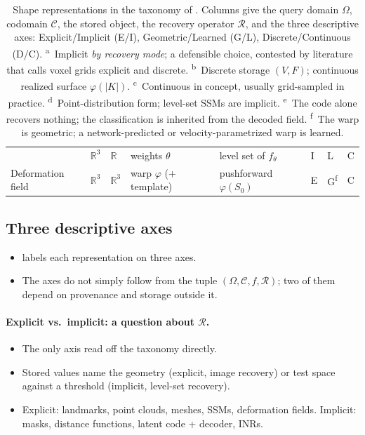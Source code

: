 \begin{table}[htbp]
\begin{tabularx}{\textwidth}{@{}l l l l X l l l@{}}
            & $\mathbb{R}^3$ & $\mathbb{R}$ & weights $\theta$
            & level set of $f_\theta$ & I & L & C \\
        Deformation field
            & $\mathbb{R}^3$ & $\mathbb{R}^3$ & warp $\varphi$ (+ template)
            & pushforward $\varphi(S_0)$ & E & G\textsuperscript{f} & C \\
        \bottomrule
    \end{tabularx}
    \caption[Taxonomy of shape representations]{Shape representations in the taxonomy of
    . Columns give the query domain $\Omega$, codomain $\mathcal{C}$, the
    stored object, the recovery operator $\mathcal{R}$, and the three descriptive axes:
    Explicit/Implicit (E/I), Geometric/Learned (G/L), Discrete/Continuous (D/C).
    \textsuperscript{a}~Implicit \emph{by recovery mode}; a defensible choice, contested by
    literature that calls voxel grids explicit and discrete.
    \textsuperscript{b}~Discrete storage $(V,F)$; continuous realized surface $\varphi(|K|)$.
    \textsuperscript{c}~Continuous in concept, usually grid-sampled in practice.
    \textsuperscript{d}~Point-distribution form; level-set SSMs are implicit.
    \textsuperscript{e}~The code alone recovers nothing; the classification is inherited from the
    decoded field. \textsuperscript{f}~The warp is geometric; a network-predicted or
    velocity-parametrized warp is learned.}
    \label{tab:shape-representations}
\end{table}

\subsection{Three descriptive axes}
\label{sec:shape-axes}

\begin{itemize}
    \item {} labels each representation on three axes.
    \item The axes do not simply follow from the tuple $(\Omega, \mathcal{C}, f, \mathcal{R})$; two of them depend on provenance and storage outside it.
\end{itemize}

\paragraph{Explicit vs.\ implicit: a question about $\mathcal{R}$.}
\begin{itemize}
    \item The only axis read off the taxonomy directly.
    \item Stored values name the geometry (explicit, image recovery) or test space against a threshold (implicit, level-set recovery).
    \item Explicit: landmarks, point clouds, meshes, SSMs, deformation fields. Implicit: masks, distance functions, latent code + decoder, INRs.
\end{itemize}


